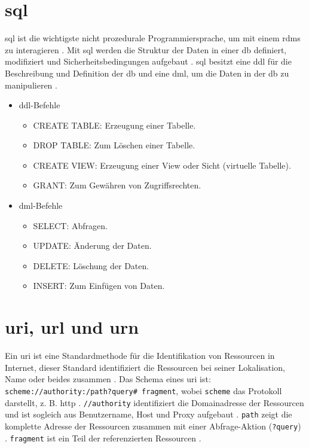 \clearpage
\renewcommand{\cleardoublepage}{}
\renewcommand{\clearpage}{}

\chapter{\acs{sql}} \label{sec:sql}

\acf{sql} ist die wichtigste nicht prozedurale Programmiersprache, um mit einem \ac{rdms} zu interagieren \cite{sqlpost}. Mit \ac{sql} werden die Struktur der Daten in einer \ac{db} definiert, modifiziert und Sicherheitsbedingungen aufgebaut \cite{dbsql}. \ac{sql} besitzt eine \ac{ddl} für die Beschreibung und Definition der \ac{db} und eine \ac{dml}, um die Daten in der \ac{db} zu manipulieren \cite{sqlpost, dbsql}.

\begin{itemize}
	\item \ac{ddl}-Befehle
	\begin{itemize}
		\item CREATE TABLE: Erzeugung einer Tabelle.
		\item DROP TABLE: Zum Löschen einer Tabelle.
		\item CREATE VIEW: Erzeugung einer View oder Sicht (virtuelle Tabelle).
		\item GRANT: Zum Gewähren von Zugriffsrechten.
	\end{itemize}
	\item \ac{dml}-Befehle
	\begin{itemize}
		\item SELECT: Abfragen.
		\item UPDATE: Änderung der Daten.
		\item DELETE: Löschung der Daten.
		\item INSERT: Zum Einfügen von Daten.
	\end{itemize}
\end{itemize}

\chapter{\acs{uri}, \acs{url} und \acs{urn}} \label{sec:uri}

Ein \acf{uri} ist eine Standardmethode für die Identifikation von Ressourcen in Internet, dieser Standard identifiziert die Ressourcen bei seiner Lokalisation, Name oder beides zusammen \cite{uribibdiff}. Das Schema eines \ac{uri} ist: \texttt{scheme://authority:/path?query\# fragment}, wobei \texttt{scheme} das Protokoll darstellt, z. B. \glqq \ac{http}\grqq{} \cite{uribibdiff, uribibdiff2}. \texttt{//authority} identifiziert die Domainadresse der Ressourcen und ist sogleich aus Benutzername, Host und Proxy aufgebaut \cite{uribibdiff, uribibdiff3}. \texttt{path} zeigt die komplette Adresse der Ressourcen zusammen mit einer Abfrage-Aktion (\texttt{?query}) \cite{uribibdiff2}. \texttt{fragment} ist ein Teil der referenzierten Ressourcen \cite{uribibdiff}.

